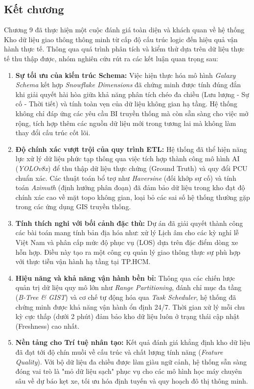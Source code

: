 \subsection{Kết chương }

Chương 9 đã thực hiện một cuộc đánh giá toàn diện và khách quan về hệ thống Kho dữ liệu giao thông thông minh từ cấp độ cấu trúc logic đến hiệu quả vận hành thực tế. Thông qua quá trình phân tích và kiểm thử dựa trên dữ liệu thực tế thu thập được, nhóm nghiên cứu rút ra các kết luận quan trọng sau:

\begin{enumerate}
    \item \textbf{Sự tối ưu của kiến trúc Schema:} Việc hiện thực hóa mô hình \textit{Galaxy Schema} kết hợp \textit{Snowflake Dimensions} đã chứng minh được tính đúng đắn khi giải quyết hài hòa giữa khả năng phân tích chéo đa chiều (Lưu lượng - Sự cố - Thời tiết) và tính toàn vẹn của dữ liệu không gian hạ tầng. Hệ thống không chỉ đáp ứng các yêu cầu BI truyền thống mà còn sẵn sàng cho việc mở rộng, tích hợp thêm các nguồn dữ liệu mới trong tương lai mà không làm thay đổi cấu trúc cốt lõi.
    
    \item \textbf{Độ chính xác vượt trội của quy trình ETL:} Hệ thống đã thể hiện năng lực xử lý dữ liệu phức tạp thông qua việc tích hợp thành công mô hình AI (\textit{YOLOv8x}) để thu thập dữ liệu thực chứng (Ground Truth) và quy đổi PCU chuẩn xác. Các thuật toán bổ trợ như \textit{Haversine} (đối khớp sự cố) và tính toán \textit{Azimuth} (định hướng phân đoạn) đã đảm bảo dữ liệu trong kho đạt độ chính xác cao về mặt topo không gian, loại bỏ các sai số hệ thống thường gặp trong các ứng dụng GIS truyền thống.
    
    \item \textbf{Tính thích nghi với bối cảnh đặc thù:} Dự án đã giải quyết thành công các bài toán mang tính bản địa hóa như: xử lý Lịch âm cho các kỳ nghỉ lễ Việt Nam và phân cấp mức độ phục vụ (LOS) dựa trên đặc điểm dòng xe hỗn hợp. Điều này tạo ra một công cụ quản lý giao thông thực sự phù hợp với thực tiễn vận hành hạ tầng tại TP.HCM.
    
    \item \textbf{Hiệu năng và khả năng vận hành bền bỉ:} Thông qua các chiến lược quản trị dữ liệu quy mô lớn như \textit{Range Partitioning}, đánh chỉ mục đa tầng (\textit{B-Tree \& GIST}) và cơ chế tự động hóa qua \textit{Task Scheduler}, hệ thống đã chứng minh được khả năng vận hành ổn định 24/7. Thời gian xử lý mỗi chu kỳ cực thấp (dưới 2 phút) đảm bảo kho dữ liệu luôn ở trạng thái cập nhật (Freshness) cao nhất.
    
    \item \textbf{Nền tảng cho Trí tuệ nhân tạo:} Kết quả đánh giá khẳng định kho dữ liệu đã đạt tới độ chín muồi về cấu trúc và chất lượng tính năng (\textit{Feature Quality}). Với bộ dữ liệu đa chiều được làm giàu ngữ cảnh, hệ thống sẵn sàng đóng vai trò là "mỏ dữ liệu sạch" phục vụ cho các mô hình học máy chuyên sâu về dự báo kẹt xe, tối ưu hóa định tuyến và quy hoạch đô thị thông minh.
\end{enumerate}

